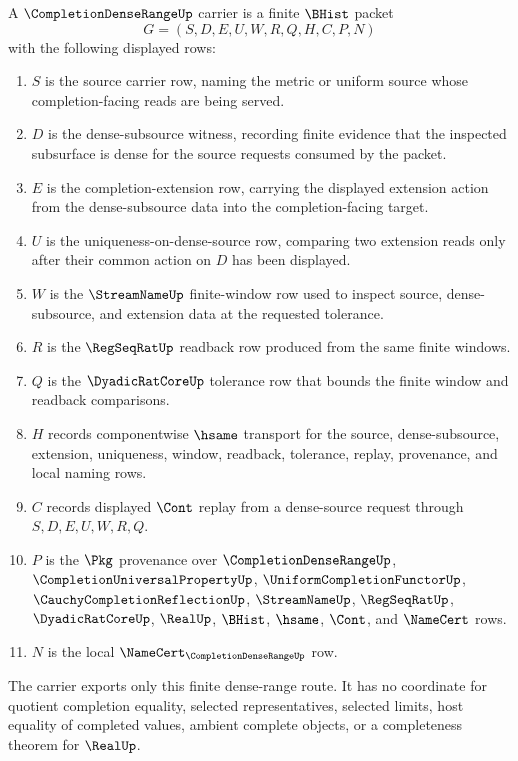 \begin{definition}\label{def:completion-dense-range-carrier}
A $\CompletionDenseRangeUp$ carrier is a finite $\BHist$ packet
$$
G=(S,D,E,U,W,R,Q,H,C,P,N)
$$
with the following displayed rows:
\begin{enumerate}
\item $S$ is the source carrier row, naming the metric or uniform source whose completion-facing reads are being served.
\item $D$ is the dense-subsource witness, recording finite evidence that the inspected subsurface is dense for the source requests consumed by the packet.
\item $E$ is the completion-extension row, carrying the displayed extension action from the dense-subsource data into the completion-facing target.
\item $U$ is the uniqueness-on-dense-source row, comparing two extension reads only after their common action on $D$ has been displayed.
\item $W$ is the $\StreamNameUp$ finite-window row used to inspect source, dense-subsource, and extension data at the requested tolerance.
\item $R$ is the $\RegSeqRatUp$ readback row produced from the same finite windows.
\item $Q$ is the $\DyadicRatCoreUp$ tolerance row that bounds the finite window and readback comparisons.
\item $H$ records componentwise $\hsame$ transport for the source, dense-subsource, extension, uniqueness, window, readback, tolerance, replay, provenance, and local naming rows.
\item $C$ records displayed $\Cont$ replay from a dense-source request through $S,D,E,U,W,R,Q$.
\item $P$ is the $\Pkg$ provenance over $\CompletionDenseRangeUp$, $\CompletionUniversalPropertyUp$, $\UniformCompletionFunctorUp$, $\CauchyCompletionReflectionUp$, $\StreamNameUp$, $\RegSeqRatUp$, $\DyadicRatCoreUp$, $\RealUp$, $\BHist$, $\hsame$, $\Cont$, and $\NameCert$ rows.
\item $N$ is the local $\NameCert_{\CompletionDenseRangeUp}$ row.
\end{enumerate}
The carrier exports only this finite dense-range route. It has no coordinate for quotient completion equality, selected representatives, selected limits, host equality of completed values, ambient complete objects, or a completeness theorem for $\RealUp$.
\end{definition}

